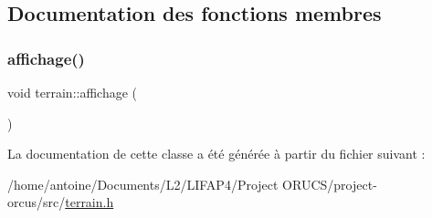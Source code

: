 \subsection{Documentation des fonctions membres}
\mbox{\label{classterrain_afe65cfabb619a0c0ffd9f3c9bdaa0e1f}} 
\subsubsection{\texorpdfstring{affichage()}{affichage()}}
{\footnotesize\ttfamily void terrain\+::affichage (\begin{DoxyParamCaption}{ }\end{DoxyParamCaption})}



La documentation de cette classe a été générée à partir du fichier suivant \+:\begin{DoxyCompactItemize}
\item 
/home/antoine/\+Documents/\+L2/\+L\+I\+F\+A\+P4/\+Project O\+R\+U\+C\+S/project-\/orcus/src/\hyperlink{terrain_8h}{terrain.\+h}\end{DoxyCompactItemize}
